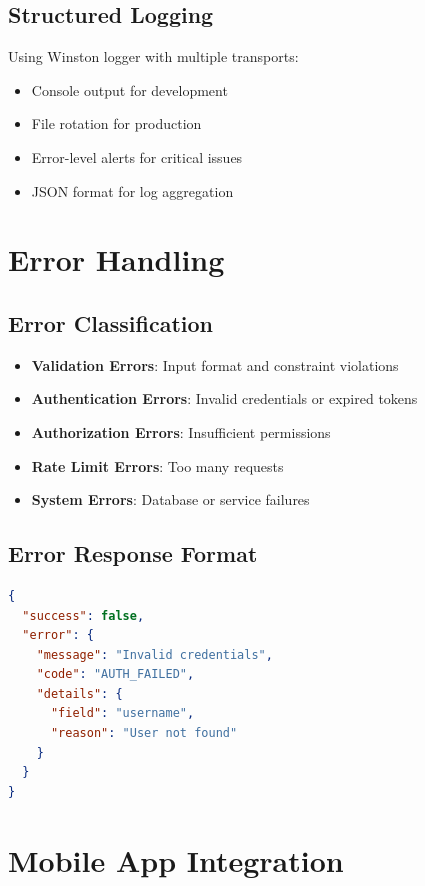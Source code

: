 \documentclass[12pt,a4paper]{article}
\begin{document}
\subsection{Structured Logging}
Using Winston logger with multiple transports:

\begin{itemize}
    \item Console output for development
    \item File rotation for production
    \item Error-level alerts for critical issues
    \item JSON format for log aggregation
\end{itemize}

\section{Error Handling}

\subsection{Error Classification}
\begin{itemize}
    \item \textbf{Validation Errors}: Input format and constraint violations
    \item \textbf{Authentication Errors}: Invalid credentials or expired tokens
    \item \textbf{Authorization Errors}: Insufficient permissions
    \item \textbf{Rate Limit Errors}: Too many requests
    \item \textbf{System Errors}: Database or service failures
\end{itemize}

\subsection{Error Response Format}
\begin{lstlisting}[language=json]
{
  "success": false,
  "error": {
    "message": "Invalid credentials",
    "code": "AUTH_FAILED",
    "details": {
      "field": "username",
      "reason": "User not found"
    }
  }
}
\end{lstlisting}

\section{Mobile App Integration}
\end{document}
